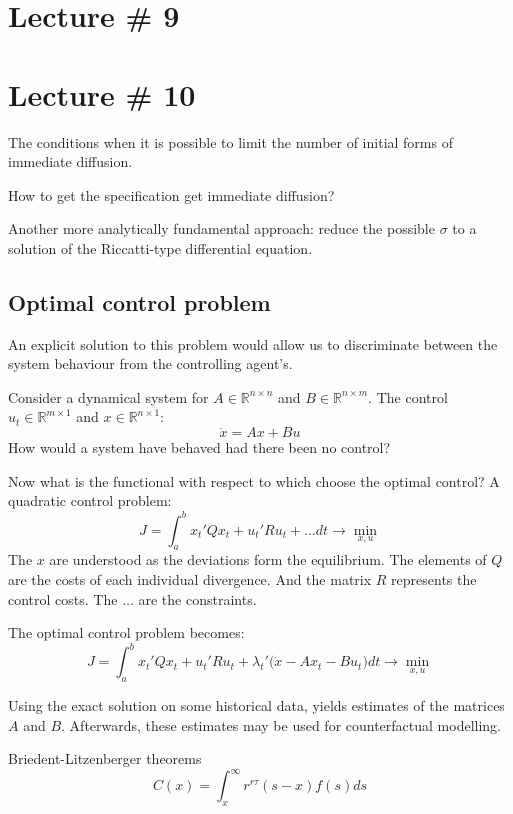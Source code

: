 \documentclass[a4paper]{article}
\newcommand{\Real}{\mathbb{R}}
\begin{document}
\section{Lecture \# 9} %
\label{sec:lecture_#_9}


\section{Lecture \# 10} %
\label{sec:lecture_10}

The conditions when it is possible to limit the number of initial forms of immediate diffusion.

How to get the specification get immediate diffusion?

Another more analytically fundamental approach: reduce the possible $\sigma$ to a solution of the Riccatti-type differential equation.

\subsection{Optimal control problem} %
\label{sub:optimal_control_problem}

An explicit solution to this problem would allow us to discriminate between the system behaviour from the controlling agent's.

Consider a dynamical system for $A\in \Real^{n\times n}$ and $B\in \Real^{n\times m}$. The control $u_t\in\Real^{m\times 1}$ and $x\in \Real^{n\times 1}$:
\[\dot{x} = Ax + Bu\]
How would a system have behaved had there been no control?

Now what is the functional with respect to which choose the optimal control? A quadratic control problem:
\[J = \int_a^b x_t'Qx_t + u_t'Ru_t + \ldots dt \to \min_{x,u}\]
The $x$ are understood as the deviations form the equilibrium. The elements of $Q$ are the costs of each individual divergence. And the matrix $R$ represents the control costs. The $\ldots$ are the constraints.

The optimal control problem becomes:
\[J = \int_a^b x_t'Qx_t + u_t'Ru_t + \lambda_t' \big(\dot{x}  - Ax_t - Bu_t\big) dt \to \min_{x,u}\]

Using the exact solution on some historical data, yields estimates of the matrices $A$ and $B$. Afterwards, these estimates may be used for counterfactual modelling.

Briedent-Litzenberger theorems
\[C(x)= \int_x^\infty r^{r\tau} (s-x) f(s) ds\]
\end{document}
